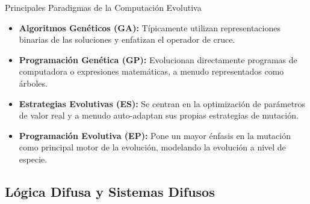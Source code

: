 \documentclass[aspectratio=169,xcolor=dvipsnames]{beamer}
\begin{document}

\begin{frame}{Principales Paradigmas de la Computación Evolutiva}
    \begin{itemize}
        \item \textbf{Algoritmos Genéticos (GA):} Típicamente utilizan representaciones binarias de las soluciones y enfatizan el operador de cruce. \pause
        
        \item \textbf{Programación Genética (GP):} Evolucionan directamente programas de computadora o expresiones matemáticas, a menudo representados como árboles. \pause
        
        \item \textbf{Estrategias Evolutivas (ES):} Se centran en la optimización de parámetros de valor real y a menudo auto-adaptan sus propias estrategias de mutación. \pause
        
        \item \textbf{Programación Evolutiva (EP):} Pone un mayor énfasis en la mutación como principal motor de la evolución, modelando la evolución a nivel de especie.
    \end{itemize}
\end{frame}

\subsection{Lógica Difusa y Sistemas Difusos}
\end{document}

